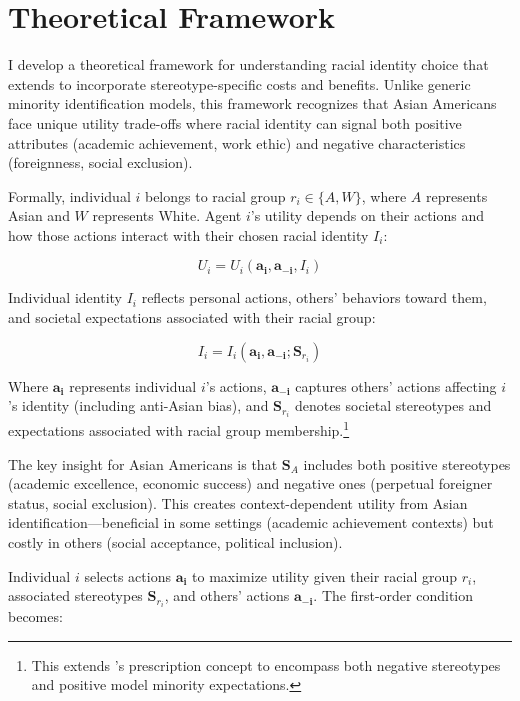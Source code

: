 \section{Theoretical Framework}\label{sec:model}

I develop a theoretical framework for understanding racial identity choice that extends \textcite{akerlofEconomicsIdentity2000} to incorporate stereotype-specific costs and benefits. Unlike generic minority identification models, this framework recognizes that Asian Americans face unique utility trade-offs where racial identity can signal both positive attributes (academic achievement, work ethic) and negative characteristics (foreignness, social exclusion).

Formally, individual $i$ belongs to racial group $r_i \in \{A, W\}$, where $A$ represents Asian and $W$ represents White. Agent $i$'s utility depends on their actions and how those actions interact with their chosen racial identity $I_i$:

\begin{equation}
U_i = U_i(\pmb{a_i}, \pmb{a_{-i}}, I_i)\label{eq:util}
\end{equation}

Individual identity $I_i$ reflects personal actions, others' behaviors toward them, and societal expectations associated with their racial group:

\begin{equation}
I_i = I_i(\pmb{a_i}, \pmb{a_{-i}}; \pmb{S}_{r_{i}})\label{eq:identity}
\end{equation}

Where $\pmb{a_i}$ represents individual $i$'s actions, $\pmb{a_{-i}}$ captures others' actions affecting $i$'s identity (including anti-Asian bias), and $\pmb{S}_{r_{i}}$ denotes societal stereotypes and expectations associated with racial group membership.\footnote{This extends \textcite{akerlofEconomicsIdentity2000}'s prescription concept to encompass both negative stereotypes and positive model minority expectations.}

The key insight for Asian Americans is that $\pmb{S}_{A}$ includes both positive stereotypes (academic excellence, economic success) and negative ones (perpetual foreigner status, social exclusion). This creates context-dependent utility from Asian identification—beneficial in some settings (academic achievement contexts) but costly in others (social acceptance, political inclusion).

Individual $i$ selects actions $\pmb{a_i}$ to maximize utility given their racial group $r_i$, associated stereotypes $\pmb{S}_{r_{i}}$, and others' actions $\pmb{a_{-i}}$. The first-order condition becomes:

